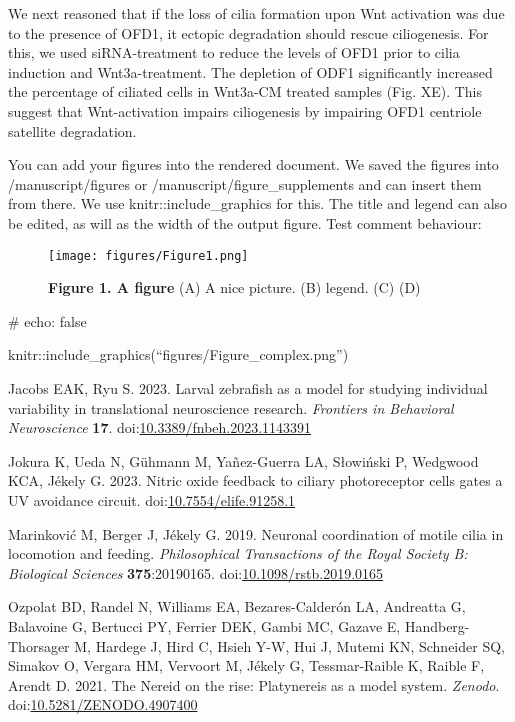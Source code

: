 \documentclass[
  11pt,
]{article}
\newlength{\cslhangindent}
\newenvironment{CSLReferences}[2] %
 {\begin{list}{}{%
  \setlength{\itemindent}{0pt}
  \setlength{\leftmargin}{0pt}
  \setlength{\parsep}{0pt}
  \ifodd #1
   \setlength{\leftmargin}{\cslhangindent}
   \setlength{\itemindent}{-1\cslhangindent}
  \fi
  \setlength{\itemsep}{#2\baselineskip}}}
 {\end{list}}
\begin{document}
We next reasoned that if the loss of cilia formation upon Wnt activation
was due to the presence of OFD1, it ectopic degradation should rescue
ciliogenesis. For this, we used siRNA-treatment to reduce the levels of
OFD1 prior to cilia induction and Wnt3a-treatment. The depletion of ODF1
significantly increased the percentage of ciliated cells in Wnt3a-CM
treated samples (Fig. XE). This suggest that Wnt-activation impairs
ciliogenesis by impairing OFD1 centriole satellite degradation.

You can add your figures into the rendered document. We saved the
figures into /manuscript/figures or /manuscript/figure\_supplements and
can insert them from there. We use knitr::include\_graphics for this.
The title and legend can also be edited, as will as the width of the
output figure. Test comment behaviour:

\begin{figure}[H]

{\centering \texttt{[image: figures/Figure1.png]}

}

\caption{\textbf{Figure 1. A figure} (A) A nice picture. (B) legend. (C)
(D)}

\end{figure}%

\#\textbar{} echo: false

knitr::include\_graphics(``figures/Figure\_complex.png'')

\label{refs}
\begin{CSLReferences}{1}{0}
Jacobs EAK, Ryu S. 2023. Larval zebrafish as a model for studying
individual variability in translational neuroscience research.
\emph{Frontiers in Behavioral Neuroscience} \textbf{17}.
doi:\href{https://doi.org/10.3389/fnbeh.2023.1143391}{10.3389/fnbeh.2023.1143391}

Jokura K, Ueda N, Gühmann M, Yañez-Guerra LA, Słowiński P, Wedgwood KCA,
Jékely G. 2023. Nitric oxide feedback to ciliary photoreceptor cells
gates a UV avoidance circuit.
doi:\href{https://doi.org/10.7554/elife.91258.1}{10.7554/elife.91258.1}

Marinković M, Berger J, Jékely G. 2019. Neuronal coordination of motile
cilia in locomotion and feeding. \emph{Philosophical Transactions of the
Royal Society B: Biological Sciences} \textbf{375}:20190165.
doi:\href{https://doi.org/10.1098/rstb.2019.0165}{10.1098/rstb.2019.0165}

Ozpolat BD, Randel N, Williams EA, Bezares-Calderón LA, Andreatta G,
Balavoine G, Bertucci PY, Ferrier DEK, Gambi MC, Gazave E,
Handberg-Thorsager M, Hardege J, Hird C, Hsieh Y-W, Hui J, Mutemi KN,
Schneider SQ, Simakov O, Vergara HM, Vervoort M, Jékely G,
Tessmar-Raible K, Raible F, Arendt D. 2021. The Nereid on the rise:
Platynereis as a model system. \emph{Zenodo}.
doi:\href{https://doi.org/10.5281/ZENODO.4907400}{10.5281/ZENODO.4907400}

\end{CSLReferences}
\end{document}

